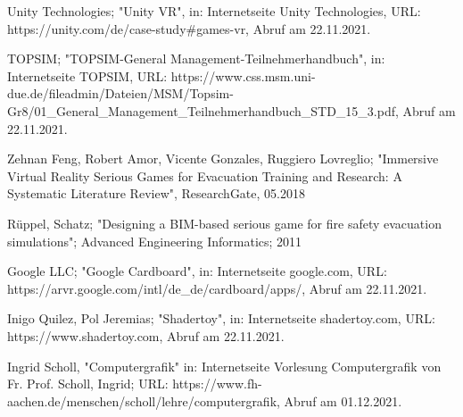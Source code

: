 \documentclass[conference]{IEEEtran}
\begin{document}
\begin{thebibliography}{00}
\vskip 0.05in
 Unity Technologies; "Unity VR", in: Internetseite Unity Technologies, URL: https://unity.com/de/case-study\#games-vr, Abruf am 22.11.2021.

\vskip 0.05in
 TOPSIM; "TOPSIM-General Management-Teilnehmerhandbuch", in: Internetseite TOPSIM, URL: https://www.css.msm.uni-due.de/fileadmin/Dateien/MSM/Topsim-Gr8/01\_General\_Management\_Teilnehmerhandbuch\_STD\_15\_3.pdf, Abruf am 22.11.2021.

\vskip 0.05in
 Zehnan Feng, Robert Amor, Vicente Gonzales, Ruggiero Lovreglio; "Immersive Virtual Reality Serious Games for Evacuation Training and Research: A Systematic Literature Review", ResearchGate, 05.2018

\vskip 0.05in
 Rüppel, Schatz; "Designing a BIM-based serious game for fire safety evacuation simulations"; Advanced Engineering Informatics; 2011

\vskip 0.05in
 Google LLC; "Google Cardboard", in: Internetseite google.com, URL: https://arvr.google.com/intl/de\_de/cardboard/apps/, Abruf am 22.11.2021.

\vskip 0.05in
 Inigo Quilez, Pol Jeremias; "Shadertoy", in: Internetseite shadertoy.com, URL: https://www.shadertoy.com, Abruf am 22.11.2021.

\vskip 0.05in
 Ingrid Scholl, "Computergrafik" in: Internetseite Vorlesung Computergrafik von Fr. Prof. Scholl, Ingrid; URL: https://www.fh-aachen.de/menschen/scholl/lehre/computergrafik, Abruf am 01.12.2021.




\end{thebibliography}
\endgroup
\end{document}
